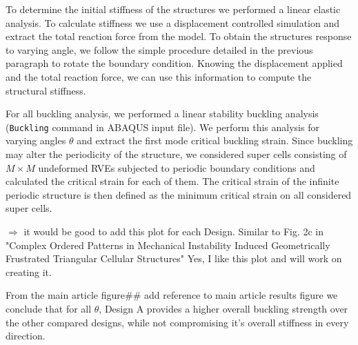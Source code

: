\documentclass[10pt,twoside]{fernandes_supp}
\newcommand{\KB}[1]{\noindent\color{blue}$\Longrightarrow$ #1\normalcolor}
\newcommand{\mf}[1]{\colorbox{blue!10}{\color{color3}#1}}
\begin{document}
To determine the initial stiffness of the structures we performed a linear elastic analysis. To calculate stiffness we use a displacement controlled simulation and extract the total reaction force from the model. To obtain the structures response to varying angle, we follow the simple procedure detailed in the previous paragraph to rotate the boundary condition. Knowing the displacement applied and the total reaction force, we can use this information to compute the structural stiffness.

For all buckling analysis, we performed a linear stability buckling analysis ({\tt *Buckling} command in ABAQUS input file). We perform this analysis for varying angles $\theta$ and extract the first mode critical buckling strain. Since buckling may alter the periodicity of the
structure, we considered super cells consisting of $M \times M$
undeformed RVEs subjected to periodic boundary
conditions and calculated the critical strain for each of
them. The critical strain of the infinite periodic structure is
then defined as the minimum critical strain on all considered
super cells. 


\KB{it would be good to add this plot for each Design. Similar to Fig. 2c in "Complex Ordered Patterns in Mechanical Instability Induced Geometrically
Frustrated Triangular Cellular Structures"} \mf{Yes, I like this plot and will work on creating it.}

From the main article figure\#\# \mf{add reference to main article results figure} we conclude that for all $\theta$, Design A provides a higher overall buckling strength over the other compared designs, while not compromising it's overall stiffness in every direction.

\end{document}
